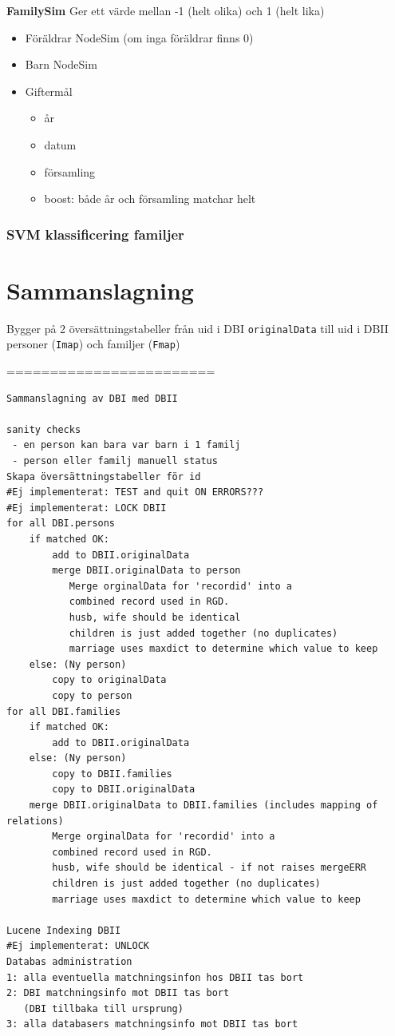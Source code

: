 \documentclass[swedish,11pt]{article}
\begin{document}
{\bf FamilySim} Ger ett värde mellan -1 (helt olika) och 1 (helt lika)\\
\begin{itemize}
\item Föräldrar NodeSim (om inga föräldrar finns 0)
\item Barn NodeSim
\item Giftermål
\begin{itemize}
\item år
\item datum
\item församling
\item boost: både år och församling matchar helt
\end{itemize}
\end{itemize}

\subsubsection{SVM klassificering familjer}\label{famsvm}

\section{Sammanslagning}
\label{merge}
Bygger på 2 översättningstabeller från uid i DBI \verb+originalData+ till uid i DBII\\
personer ({\tt Imap}) och familjer ({\tt Fmap})

========================
\begin{verbatim}
Sammanslagning av DBI med DBII

sanity checks
 - en person kan bara var barn i 1 familj
 - person eller familj manuell status
Skapa översättningstabeller för id
#Ej implementerat: TEST and quit ON ERRORS???
#Ej implementerat: LOCK DBII
for all DBI.persons
    if matched OK:
        add to DBII.originalData
        merge DBII.originalData to person
           Merge orginalData for 'recordid' into a
           combined record used in RGD.
           husb, wife should be identical
           children is just added together (no duplicates)
           marriage uses maxdict to determine which value to keep
    else: (Ny person)
        copy to originalData
        copy to person
for all DBI.families
    if matched OK:
        add to DBII.originalData
    else: (Ny person)
        copy to DBII.families
        copy to DBII.originalData
    merge DBII.originalData to DBII.families (includes mapping of relations)
        Merge orginalData for 'recordid' into a
        combined record used in RGD.
        husb, wife should be identical - if not raises mergeERR
        children is just added together (no duplicates)
        marriage uses maxdict to determine which value to keep

Lucene Indexing DBII
#Ej implementerat: UNLOCK
Databas administration
1: alla eventuella matchningsinfon hos DBII tas bort
2: DBI matchningsinfo mot DBII tas bort
   (DBI tillbaka till ursprung)
3: alla databasers matchningsinfo mot DBII tas bort
\end{verbatim}
\end{document}
